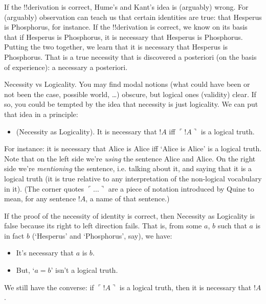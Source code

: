 \documentclass[../../../include/open-logic-section]{subfiles}
\begin{document}
If the !!{derivation} is correct, Hume's and Kant's idea is (arguably) 
wrong. For (arguably) observation can teach us that certain identities
are true: that Hesperus is Phosphorus, for instance. If the !!{derivation}
is correct, we know on its basis that if Hesperus is Phosphorus, it is 
necessary that Hesperus is Phosphorus. Putting the two together, we 
learn that  it is necessary that Hesperus is Phosphorus. That is a 
true necessity that is discovered a posteriori (on the basis of 
experience): a necessary a posteriori. 

Necessity vs Logicality. You may find modal notions (what could have 
been or not been the case, possible world, \dots) obscure, but logical
ones (validity) clear. If so, you could be tempted by the idea that 
necessity is just logicality. We can put that idea in a principle:

\begin{itemize}
\item (Necessity as Logicality). It is necessary that $!A$ iff
$\ulcorner!A\urcorner$ is a logical truth.
\end{itemize}

For instance: it is necessary that Alice is Alice iff `Alice is Alice'
is a logical truth. Note that on the left side we're \emph{using} the
sentence Alice and Alice. On the right side we're \emph{mentioning}
the sentence, i.e. talking about it, and saying that it is a logical
truth (it is true relative to any interpretation of the non-logical
vocabulary in it). (The corner quotes $\ulcorner\ldots\urcorner$ are a piece of notation 
introduced by Quine to mean, for any sentence $!A$, a name of that 
sentence.)

If the proof of the necessity of identity is correct, then Necessity 
as Logicality is false because its right to left direction fails. 
That is, from some $a$, $b$ such that $a$ is in fact $b$ (`Hesperus'
and `Phosphorus', say), we have: 

\begin{itemize}
\item It's necessary that $a$ is $b$.
\item But, `$a=b$' isn't a logical truth.
\end{itemize}

We still have the converse: if $\ulcorner!A\urcorner$ is a logical 
truth, then it is necessary that $!A$.
\end{document}
